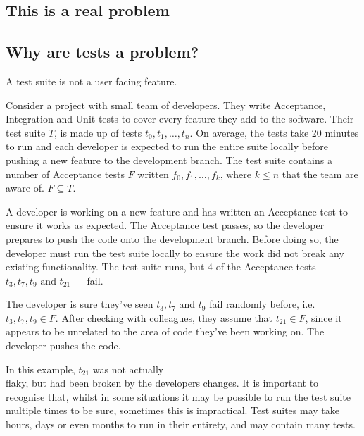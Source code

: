 \subsection{This is a real problem}



\subsection{Why are \flaky{} tests a problem?}

A test suite is not a user facing feature.

Consider a project with small team of developers. They write Acceptance, Integration and Unit tests to cover every feature they add to the software. Their test suite $T$, is made up of tests $t_{0}, t_{1}, \dots, t_{n}$. On average, the tests take 20 minutes to run and each developer is expected to run the entire suite locally before pushing a new feature to the development branch. The test suite contains a number of \flaky{} Acceptance tests $F$ written $f_{0}, f_{1}, \dots, f_{k} \text{, where $k \leq n$}$ that the team are aware of. $F \subseteq T$.

A developer is working on a new feature and has written an Acceptance test to ensure it works as expected. The Acceptance test passes, so the developer prepares to push the code onto the development branch. Before doing so, the developer must run the test suite locally to ensure the work did not break any existing functionality. The test suite runs, but 4 of the Acceptance tests --- $t_{3}, t_{7}, t_{9} \text{ and } t_{21}$ --- fail.

The developer is sure they’ve seen $t_{3}, t_{7} \text{ and } t_{9}$ fail randomly before, i.e. $t_{3}, t_{7}, t_{9} \in F$. After checking with colleagues, they assume that $t_{21} \in F$, since it appears to be unrelated to the area of code they’ve been working on. The developer pushes the code.

In this example, $t_{21}$ was not actually \\flaky{}, but had been broken by the developers changes. It is important to recognise that, whilst in some situations it may be possible to run the test suite multiple times to be sure, sometimes this is impractical. Test suites may take hours, days or even months to run in their entirety, and may contain many \flaky{} tests.

